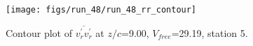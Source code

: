 \begin{figure}[H]
\centering
\texttt{[image: figs/run\_48/run\_48\_rr\_contour]}
\caption{Contour plot of $\overline{v_{r}^{\prime} v_{r}^{\prime}}$ at $z/c$=9.00, $V_{free}$=29.19, station 5.}
\label{fig:run_48_rr_contour}
\end{figure}


